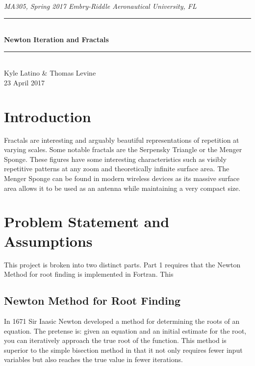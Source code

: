 \documentclass[11pt]{article}
\newcommand{\horrule}[1]{\rule{\linewidth}{#1}} 	%
\begin{document}
\begin{center}
{\it MA305, Spring 2017 \hfill Embry-Riddle Aeronautical University, FL 
 }
		\horrule{0.5pt} \\[0.4cm]
		{\bf \Large  Newton Iteration and Fractals}\\
		\horrule{2pt} \\[2cm]
Kyle Latino \& Thomas Levine
\\[0.4cm]
23 April 2017 %
\end{center}
\thispagestyle{empty}
\newpage
\begin{abstract}

\end{abstract}
\tableofcontents 
\newpage

\section{Introduction}\label{S:1}
Fractals are interesting and arguably beautiful representations of repetition at varying scales. Some notable fractals are the Serpensky Triangle or the Menger Sponge. These figures have some interesting characteristics such as visibly repetitive patterns at any zoom and theoretically infinite surface area. The Menger Sponge can be found in modern wireless devices as its massive surface area allows it to be used as an antenna while maintaining a very compact size.


\section{Problem Statement and Assumptions}\label{S:2}
This project is broken into two distinct parts. Part 1 requires that the Newton Method for root finding is implemented in Fortran. This 


\subsection{Newton Method for Root Finding}\label{S:2.1}
In 1671 Sir Iaasic Newton developed a method for determining the roots of an equation. The pretense is: given an equation and an initial estimate for the root, you can iteratively approach the true root of the function. This method is superior to the simple bisection method in that it not only requires fewer input variables but also reaches the true value in fewer iterations. 
\end{document}
